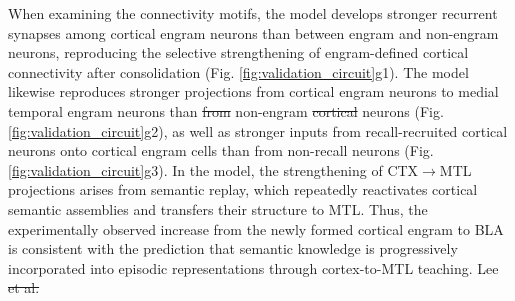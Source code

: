 \documentclass{article}
\providecommand{\DIFaddtex}[1]{{\protect\color{blue}\uwave{#1}}} %
\providecommand{\DIFdeltex}[1]{{\protect\color{red}\sout{#1}}}                      %
\providecommand{\DIFaddbegin}{} %
\providecommand{\DIFaddend}{} %
\providecommand{\DIFdelbegin}{} %
\providecommand{\DIFdelend}{} %
\providecommand{\DIFadd}[1]{\texorpdfstring{\DIFaddtex{#1}}{#1}} %
\providecommand{\DIFdel}[1]{\texorpdfstring{\DIFdeltex{#1}}{}} %
\begin{document}
\newline\newline
When examining the connectivity motifs, the model develops stronger recurrent synapses among cortical engram neurons than between engram and non-engram neurons, reproducing the selective strengthening of engram-defined cortical connectivity after consolidation (Fig. \ref{fig:validation_circuit}g1). The model likewise reproduces stronger projections from cortical engram neurons to medial temporal engram neurons than \DIFdelbegin \DIFdel{from }\DIFdelend \DIFaddbegin \DIFadd{to }\DIFaddend non-engram \DIFdelbegin \DIFdel{cortical }\DIFdelend \DIFaddbegin \DIFadd{medial temporal }\DIFaddend neurons (Fig. \ref{fig:validation_circuit}g2), as well as stronger inputs from recall-recruited cortical neurons onto cortical engram cells than from non-recall neurons (Fig. \ref{fig:validation_circuit}g3). In the model, the strengthening of CTX$\rightarrow$MTL projections arises from semantic replay, which repeatedly reactivates cortical semantic assemblies and transfers their structure to MTL. Thus, the experimentally observed increase from the newly formed cortical engram to BLA is consistent with the prediction that semantic knowledge is progressively incorporated into episodic representations through cortex-to-MTL teaching.
\newline\newline
Lee \DIFdelbegin \DIFdel{et al. }%
\end{document}
